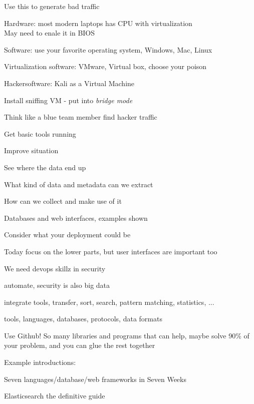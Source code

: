 \documentclass[20pt,landscape,a4paper,footrule]{foils}
\begin{document}
\vskip 1cm
\centerline{Use this to generate bad traffic}



\begin{list2}
\item Hardware: most modern laptops has CPU with virtualization \\
May need to enale it in BIOS
\item Software: use your favorite operating system, Windows, Mac, Linux
\item Virtualization software: VMware, Virtual box, choose your poison
\item Hackersoftware: Kali as a Virtual Machine 
\item Install sniffing VM - put into \emph{bridge mode}
\end{list2}



\begin{list1}
\item Think like a blue team member find hacker traffic
\item Get basic tools running
\item Improve situation
\begin{list2}
\item See where the data end up
\item What kind of data and metadata can we extract
\item How can we collect and make use of it
\item Databases and web interfaces, examples shown
\item Consider what your deployment could be
\end{list2}
\end{list1}

\centerline{Today focus on the lower parts, but user interfaces are important too}


\begin{list1}
\item We need devops skillz in security
\item automate, security is also big data
\item integrate tools, transfer, sort, search, pattern matching, statistics, ...
\item tools, languages, databases, protocols, data formats
\item Use Github! So many libraries and programs that can help, maybe solve  90\% of your problem, and you can glue the rest together
\item Example introductions:
\begin{list2}
\item Seven languages/database/web frameworks in Seven Weeks
\item Elasticsearch the definitive guide
\end{list2}
\end{list1}
\end{document}
